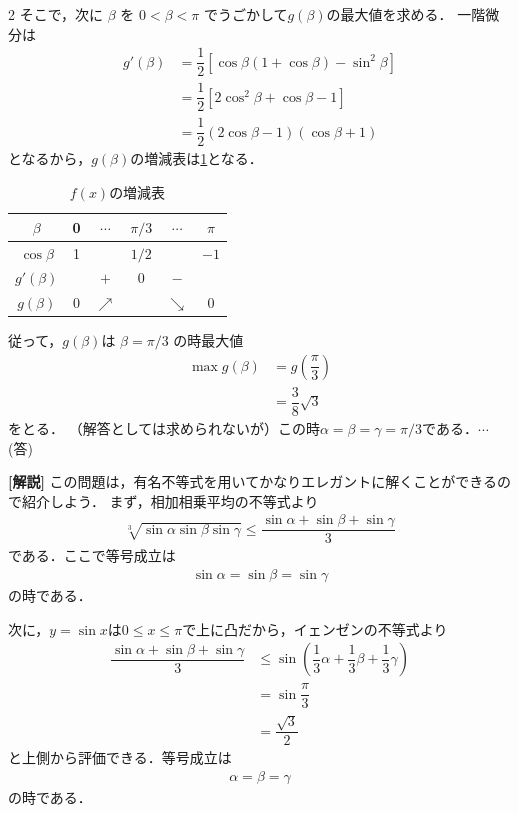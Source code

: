 \documentclass[../../main.tex]{subfiles}
\begin{document}
\begin{multicols}{2}
  そこで，次に $\beta$ を $0 < \beta < \pi$ でうごかして$g(\beta)$の最大値を求める．
  一階微分は
  \begin{align}
    g'(\beta)
    & = \dfrac{1}{2}\left[\cos\beta(1+\cos\beta)-\sin^2\beta\right] \\
    & = \dfrac{1}{2}\left[2\cos^2\beta + \cos \beta -1\right]       \\
    & = \dfrac{1}{2}(2\cos\beta-1)(\cos\beta+1)
  \end{align}
  となるから，$g(\beta)$の増減表は\cref{1999-2:table:1}となる．

  \begin{table}[H]
    \centering
    \caption{$f(x)$の増減表}
    \label{1999-2:table:1}
    \begin{tabular}{|c||c|c|c|c|c|}
      \hline
      $\beta$     & 0 & $\cdots$   & $\pi/3$ & $\cdots$  & $\pi$ \\
      \hline
      $\cos\beta$ & 1 &            & $1/2$   &           & $-1$  \\
      \hline
      $g'(\beta)$ &   & $+$        & 0       & $-$       &       \\
      \hline
      $g(\beta)$  & 0 & $\nearrow$ &         & $\searrow$ &  0     \\
      \hline
    \end{tabular}
  \end{table}

  従って，$g(\beta)$は $\beta = \pi/3$ の時最大値
  \begin{align}
    \max g(\beta)
    & = g\left(\dfrac{\pi}{3}\right) \\
    & = \dfrac{3}{8}\sqrt{3}
  \end{align}
  をとる．
  （解答としては求められないが）この時$\alpha = \beta = \gamma = \pi/3$である．$\cdots$(答)

  {\bf [解説]}
  この問題は，有名不等式を用いてかなりエレガントに解くことができるので紹介しよう．
  まず，相加相乗平均の不等式より
  \begin{align}
    \sqrt[3]{\sin\alpha\sin\beta\sin\gamma} \le \dfrac{\sin\alpha+\sin\beta+\sin\gamma}{3}
  \end{align}
  である．ここで等号成立は
  \begin{align}
    \sin\alpha=\sin\beta=\sin\gamma
  \end{align}
  の時である．

  次に，$y=\sin x$は$0\le x\le \pi$で上に凸だから，イェンゼンの不等式より
  \begin{align}
    \dfrac{\sin\alpha+\sin\beta+\sin\gamma}{3}
    & \le \sin\left(\dfrac{1}{3}\alpha+\dfrac{1}{3}\beta+\dfrac{1}{3}\gamma\right) \\
    & = \sin\dfrac{\pi}{3}                                                       \\
    & = \dfrac{\sqrt{3}}{2}
  \end{align}
  と上側から評価できる．等号成立は
  \begin{align}
    \alpha=\beta=\gamma
  \end{align}
  の時である．


\end{multicols}
\end{document}
